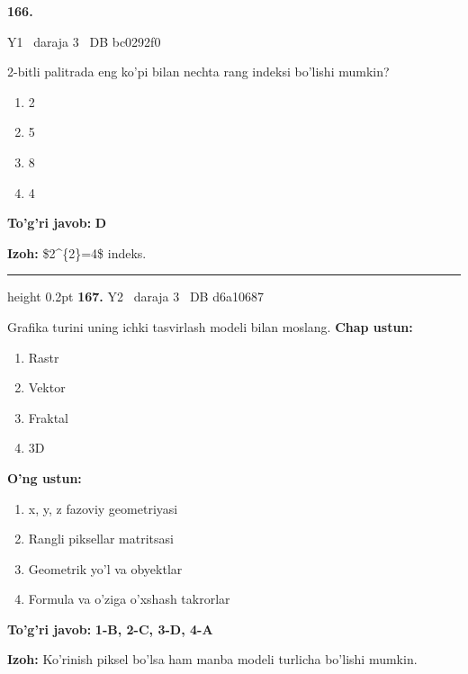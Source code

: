 \documentclass[10pt,a4paper,oneside]{article}
\begin{document}
\hypertarget{q166}{\textbf{\color{ink}166.}}  {\color{muted}\scriptsize Y1 \textbullet\ daraja 3 \textbullet\ DB bc0292f0}
\par
2-bitli palitrada eng ko'pi bilan nechta rang indeksi bo'lishi mumkin?
\begin{enumerate}[label=\Alph*),leftmargin=9mm]
\item 2
\item 5
\item 8
\item 4
\end{enumerate}
\begin{tcolorbox}[enhanced,breakable,colback=teal!4,colframe=teal!45!black,boxrule=0.45pt,arc=1.2mm,left=2.8mm,right=2.8mm,top=2mm,bottom=2mm,before skip=2mm,after skip=2mm]
\textbf{\color{teal}To'g'ri javob:} \textbf{D}
\par\smallskip
\textbf{Izoh:} \$2\textasciicircum{}\{2\}=4\$ indeks.
\end{tcolorbox}
\vspace{2mm}\hrule height 0.2pt \vspace{4mm}
\hypertarget{q167}{\textbf{\color{ink}167.}}  {\color{muted}\scriptsize Y2 \textbullet\ daraja 3 \textbullet\ DB d6a10687}
\par
Grafika turini uning ichki tasvirlash modeli bilan moslang.
\textbf{\footnotesize Chap ustun:}
\begin{enumerate}[label=\arabic*),leftmargin=9mm]
\item Rastr
\item Vektor
\item Fraktal
\item 3D
\end{enumerate}
\textbf{\footnotesize O'ng ustun:}
\begin{enumerate}[label=\Alph*),leftmargin=9mm]
\item x, y, z fazoviy geometriyasi
\item Rangli piksellar matritsasi
\item Geometrik yo'l va obyektlar
\item Formula va o'ziga o'xshash takrorlar
\end{enumerate}
\begin{tcolorbox}[enhanced,breakable,colback=teal!4,colframe=teal!45!black,boxrule=0.45pt,arc=1.2mm,left=2.8mm,right=2.8mm,top=2mm,bottom=2mm,before skip=2mm,after skip=2mm]
\textbf{\color{teal}To'g'ri javob:} \textbf{1-B, 2-C, 3-D, 4-A}
\par\smallskip
\textbf{Izoh:} Ko'rinish piksel bo'lsa ham manba modeli turlicha bo'lishi mumkin.
\end{tcolorbox}
\end{document}
